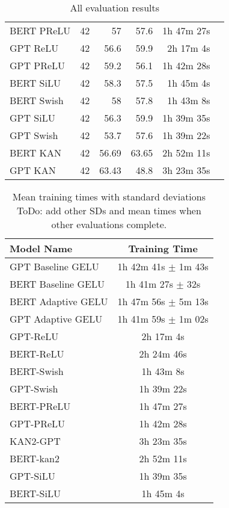 \begin{table}[!htp]
\begin{tabular}{lrrrrr}
    BERT PReLU &42 &57 &57.6 &1h 47m 27s \\
    GPT ReLU &42 &56.6 &59.9 &2h 17m 4s \\
    GPT PReLU &42 &59.2 &56.1 &1h 42m 28s \\
    BERT SiLU &42 &58.3 &57.5 &1h 45m 4s \\
    BERT Swish &42 &58 &57.8 &1h 43m 8s \\
    GPT SiLU &42 &56.3 &59.9 &1h 39m 35s \\
    GPT Swish &42 &53.7 &57.6 &1h 39m 22s \\
    BERT KAN &42 &56.69 &63.65 &2h 52m 11s \\
    GPT KAN &42 &63.43 &48.8 &3h 23m 35s \\
    \bottomrule
    \end{tabular}
    \caption{All evaluation results}\label{table:all-results}
\end{table}

\begin{table}[h!]
    \centering
    \begin{tabular}{|l|c|}
    \hline
    \textbf{Model Name} & \textbf{Training Time} \\ \hline
    GPT Baseline GELU & 1h 42m 41s $\pm$ 1m 43s \\ \hline
    BERT Baseline GELU & 1h 41m 27s $\pm$ 32s \\ \hline
    BERT Adaptive GELU & 1h 47m 56s $\pm$ 5m 13s \\ \hline
    GPT Adaptive GELU & 1h 41m 59s $\pm$ 1m 02s \\ \hline
    GPT-ReLU & 2h 17m 4s \\ \hline
    BERT-ReLU & 2h 24m 46s \\ \hline
    BERT-Swish & 1h 43m 8s \\ \hline
    GPT-Swish & 1h 39m 22s \\ \hline
    BERT-PReLU & 1h 47m 27s \\ \hline
    GPT-PReLU & 1h 42m 28s \\ \hline
    KAN2-GPT & 3h 23m 35s \\ \hline
    BERT-kan2 & 2h 52m 11s \\ \hline
    GPT-SiLU & 1h 39m 35s \\ \hline
    BERT-SiLU & 1h 45m 4s \\ \hline
    \end{tabular}
    \caption{Mean training times with standard deviations ToDo: add other SDs and mean times when other evaluations complete.}
    \label{tab:training-times}
\end{table}
\newpage